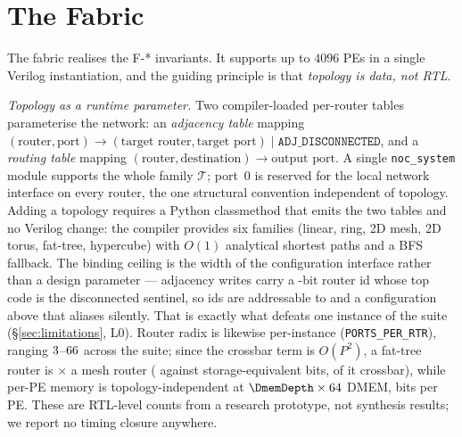 \documentclass[journal,10pt]{IEEEtran}
\theoremstyle{plain}
\theoremstyle{definition}
\theoremstyle{remark}
\newcommand{\sv}[1]{\texttt{#1}}
\newcommand{\T}{\ensuremath{\mathcal{T}}}
\begin{document}
\section{The Fabric}\label{sec:fabric}

The fabric realises the \textsf{F-*} invariants. It supports up to $4096$ PEs
in a single Verilog instantiation, and the guiding principle is that
\emph{topology is data, not RTL}.

\emph{Topology as a runtime parameter.} Two compiler-loaded per-router tables
parameterise the network: an \emph{adjacency table} mapping
$(\text{router},\text{port}) \to (\text{target router},\text{target port})
\mid \sv{ADJ\_DISCONNECTED}$, and a \emph{routing table} mapping
$(\text{router},\text{destination}) \to \text{output port}$. A single
\sv{noc\_system} module supports the whole family $\T$; port~0 is reserved for
the local network interface on every router, the one structural convention
independent of topology. Adding a topology requires a Python classmethod that
emits the two tables and no Verilog change: the compiler provides six families
(linear, ring, 2D mesh, 2D torus, fat-tree, hypercube) with $O(1)$ analytical
shortest paths and a BFS fallback. The binding ceiling is the width of the
configuration interface rather than a design parameter --- adjacency writes
carry a \RouterIdBits-bit router id whose top code is the disconnected
sentinel, so ids are addressable to \RouterIdMax{} and a configuration above
that aliases silently. That is exactly what defeats one instance of the suite
(\S\ref{sec:limitations}, L0). Router radix is likewise per-instance
(\sv{PORTS\_PER\_RTR}), ranging $3$--$66$ across the suite;
since the crossbar term is $O(P^2)$, a fat-tree router is
\RouterBlowup$\times$ a mesh router (\RouterBitsFt{} against \RouterBitsLo{}
storage-equivalent bits, \XbarShareFt{} of it crossbar), while per-PE memory
is topology-independent at $\DmemDepth \times 64$ DMEM, \PerPEBits{} bits per
PE. These are RTL-level counts from a research prototype, not synthesis
results; we report no timing closure anywhere.
\end{document}
